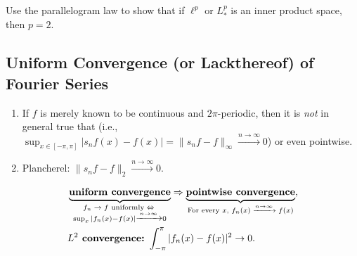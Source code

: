 \documentclass[letterpaper, reqno,11pt]{article}
\begin{document}
\begin{enumerate}
\begin{enumerate}
    \begin{figure}[H]
      \centering
    \end{figure}

     Use the parallelogram law to show that if $\ell^p$ or $L_*^p$ is an inner product space, then $p = 2$.
  \end{enumerate}
\end{enumerate}

\subsection{Uniform Convergence (or Lackthereof) of Fourier Series}

\begin{enumerate}
\item If $f$ is merely known to be continuous and $2\pi$-periodic, then it is \emph{not} in general true that  (i.e., $\sup_{x \in [-\pi, \pi]} |s_n f(x) - f(x)| = \lVert s_n f - f \rVert_\infty \xrightarrow{n \to \infty} 0$) or even pointwise.
\item Plancherel: $\lVert s_n f - f \rVert_2 \xrightarrow{n \to \infty} 0$.
\end{enumerate}

\begin{align*}
  & \underbrace{\text{\bf uniform convergence}}_{\substack{\text{$f_n \to f$ uniformly} \;\Leftrightarrow\; \\ \sup_x |f_n(x) - f(x)| \xrightarrow{n \to \infty} 0}} \Rightarrow \underbrace{\text{\bf pointwise convergence}}_\text{For every $x$, $f_n(x) \xrightarrow{n \to \infty} f(x)$}, \\
  & \text{\bf $L^2$ convergence: $\int_{-\pi}^\pi |f_n(x) - f(x)|^2 \to 0$}.
\end{align*}
\end{document}
